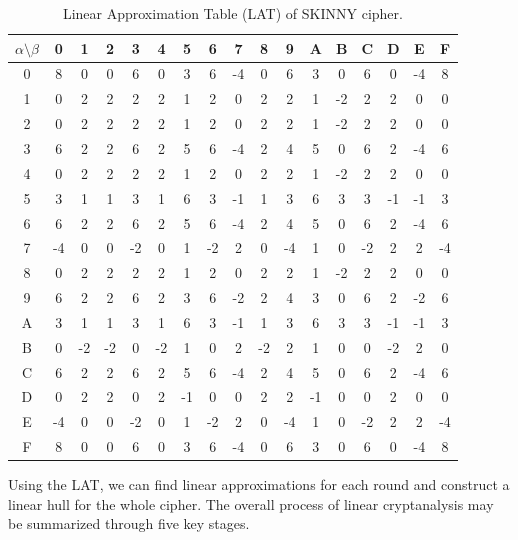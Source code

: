 \begin{table}[h!]
\centering
\caption{Linear Approximation Table (LAT) of SKINNY cipher.}
\begin{tabular}{|c|c|c|c|c|c|c|c|c|c|c|c|c|c|c|c|c|}
\hhline{|=|=|=|=|=|=|=|=|=|=|=|=|=|=|=|=|=|}
$\alpha \setminus \beta$ & 0 & 1 & 2 & 3 & 4 & 5 & 6 & 7 & 8 & 9 & A & B & C & D & E & F \\
\hline
0 & 8 & 0 & 0 & 6 & 0 & 3 & 6 & -4 & 0 & 6 & 3 & 0 & 6 & 0 & -4 & 8 \\
\hline
1 & 0 & 2 & 2 & 2 & 2 & 1 & 2 & 0 & 2 & 2 & 1 & -2 & 2 & 2 & 0 & 0 \\
\hline
2 & 0 & 2 & 2 & 2 & 2 & 1 & 2 & 0 & 2 & 2 & 1 & -2 & 2 & 2 & 0 & 0 \\
\hline
3 & 6 & 2 & 2 & 6 & 2 & 5 & 6 & -4 & 2 & 4 & 5 & 0 & 6 & 2 & -4 & 6 \\
\hline
4 & 0 & 2 & 2 & 2 & 2 & 1 & 2 & 0 & 2 & 2 & 1 & -2 & 2 & 2 & 0 & 0 \\
\hline
5 & 3 & 1 & 1 & 3 & 1 & 6 & 3 & -1 & 1 & 3 & 6 & 3 & 3 & -1 & -1 & 3 \\
\hline
6 & 6 & 2 & 2 & 6 & 2 & 5 & 6 & -4 & 2 & 4 & 5 & 0 & 6 & 2 & -4 & 6 \\
\hline
7 & -4 & 0 & 0 & -2 & 0 & 1 & -2 & 2 & 0 & -4 & 1 & 0 & -2 & 2 & 2 & -4 \\
\hline
8 & 0 & 2 & 2 & 2 & 2 & 1 & 2 & 0 & 2 & 2 & 1 & -2 & 2 & 2 & 0 & 0 \\
\hline
9 & 6 & 2 & 2 & 6 & 2 & 3 & 6 & -2 & 2 & 4 & 3 & 0 & 6 & 2 & -2 & 6 \\
\hline
A & 3 & 1 & 1 & 3 & 1 & 6 & 3 & -1 & 1 & 3 & 6 & 3 & 3 & -1 & -1 & 3 \\
\hline
B & 0 & -2 & -2 & 0 & -2 & 1 & 0 & 2 & -2 & 2 & 1 & 0 & 0 & -2 & 2 & 0 \\
\hline
C & 6 & 2 & 2 & 6 & 2 & 5 & 6 & -4 & 2 & 4 & 5 & 0 & 6 & 2 & -4 & 6 \\
\hline
D & 0 & 2 & 2 & 0 & 2 & -1 & 0 & 0 & 2 & 2 & -1 & 0 & 0 & 2 & 0 & 0 \\
\hline
E & -4 & 0 & 0 & -2 & 0 & 1 & -2 & 2 & 0 & -4 & 1 & 0 & -2 & 2 & 2 & -4 \\
\hline
F & 8 & 0 & 0 & 6 & 0 & 3 & 6 & -4 & 0 & 6 & 3 & 0 & 6 & 0 & -4 & 8 \\
\hline
\end{tabular}

\label{tbl:LAT}
\end{table}


Using the LAT, we can find linear approximations for each round and construct a linear hull for the whole cipher. The overall process of linear cryptanalysis may be summarized through five key stages.

